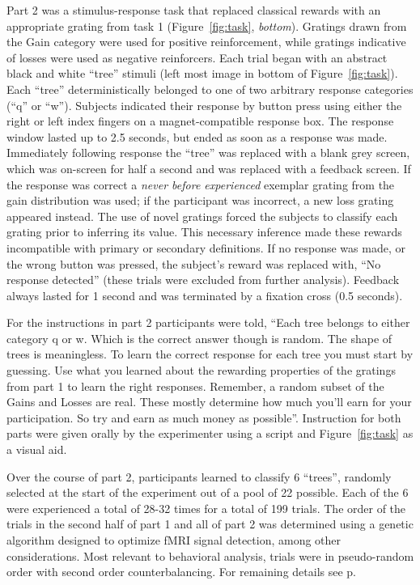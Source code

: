 Part 2 was a stimulus-response task that replaced classical rewards with an appropriate grating from task 1 (Figure~\ref{fig:task}, \emph{bottom}).  Gratings drawn from the Gain category were used for positive reinforcement, while gratings indicative of losses were used as negative reinforcers.   Each trial began with an abstract black and white ``tree'' stimuli (left most image in bottom of Figure~\ref{fig:task}).  Each ``tree'' deterministically belonged to one of two arbitrary response categories (``q'' or ``w'').  Subjects indicated their response by button press using either the right or left index fingers on a magnet-compatible response box.  The response window lasted up to 2.5 seconds, but ended as soon as a response was made.  Immediately following response the ``tree'' was replaced with a blank grey screen, which was on-screen for half a second and was replaced with a feedback screen.  If the response was correct a \emph{never before experienced} exemplar grating from the gain distribution was used; if the participant was incorrect, a new loss grating appeared instead.  The use of novel gratings forced the subjects to classify each grating prior to inferring its value.  This necessary inference made these rewards incompatible with primary or secondary definitions.  If no response was made, or the wrong button was pressed, the subject's reward was replaced with, ``No response detected'' (these trials were excluded from further analysis).  Feedback always lasted for 1 second and was terminated by a fixation cross (0.5 seconds).  

For the instructions in part 2 participants were told, ``Each tree belongs to either category q or w.  Which is the correct answer though is random.  The shape of trees is meaningless.  To learn the correct response for each tree you must start by guessing.  Use what you learned about the rewarding properties of the gratings from part 1 to learn the right responses.  Remember, a random subset of the Gains and Losses are real.  These mostly determine how much you'll earn for your participation.  So try and earn as much money as possible''.  Instruction for both parts were given orally by the experimenter using a script and Figure~\ref{fig:task} as a visual aid.

Over the course of part 2, participants learned to classify 6 ``trees'', randomly selected at the start of the experiment out of a pool of 22 possible.  Each of the 6 were experienced a total of 28-32 times for a total of 199 trials. The order of the trials in the second half of part 1 and all of part 2 was determined using a genetic algorithm designed to optimize fMRI signal detection, among other considerations.  Most relevant to behavioral analysis, trials were in pseudo-random order with second order counterbalancing.  For remaining details see p\pageref{sub:acquired}.

